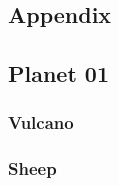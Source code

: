 \newpage
\begin{appendix}
\renewcommand{\thesection}{\Alph{section}}
\renewcommand{\appendixname}{Appendix}
\renewcommand{\thesubsection}{\thesection.\arabic{subsection}}
\renewcommand\thefigure{\thesection.\arabic{figure}}
\renewcommand\thetable{\thesection.\arabic{table}}
\setcounter{table}{0}
\setcounter{figure}{0}




\section{Appendix}
\subsection{Planet 01}
\subsubsection{Vulcano}
\subsubsection{Sheep}





\end{appendix}
